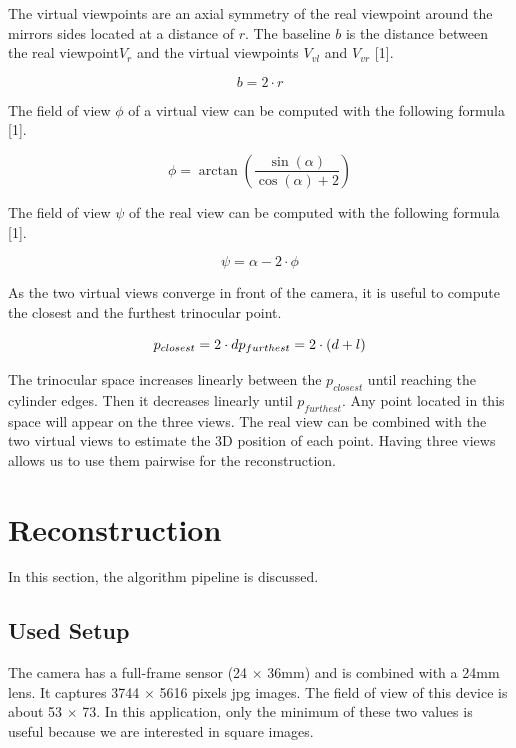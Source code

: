 \documentclass[a4paper,twocolumn,fleqn]{article}
\begin{document}
The virtual viewpoints are an axial symmetry of the real viewpoint around the mirrors sides located at a distance of $r$. The baseline $b$ is the distance between the real viewpoint$V_r$ and the virtual viewpoints $V_{vl}$ and $V_{vr}$ [1].

\begin{equation}
  b = 2 \cdot r
\end{equation}

The field of view $\phi$ of a virtual view can be computed with the following formula [1].

\begin{equation}
\phi = \arctan (\frac{\sin{(\alpha)}}{\cos(\alpha) + 2})
\end{equation}

The field of view $\psi$ of the real view can be computed with the following formula [1].

\begin{equation}
\psi = \alpha -2 \cdot \phi
\end{equation}

As the two virtual views converge in front of the camera, it is useful to compute the closest and the furthest trinocular point.

\begin{equation}
p_{closest} = 2 \cdot d \newline
p_{furthest} = 2 \cdot (d + l)
\end{equation}

The trinocular space increases linearly between the $p_{closest}$ until reaching the cylinder edges. Then it decreases linearly until $p_{furthest}$. Any point located in this space will appear on the three views. The real view can be combined with the two virtual views to estimate the 3D position of each point. Having three views allows us to use them pairwise for the reconstruction.

\section{Reconstruction}
In this section, the algorithm pipeline is discussed.

\subsection{Used Setup}
The camera has a full-frame sensor (24 $\times$ 36mm) and is combined with a 24mm lens. It captures 3744 $\times$ 5616 pixels jpg images. The field of view of this device is about 53 $\times$ 73\textdegree. In this application, only the minimum of these two values is useful because we are interested in square images.
\end{document}
